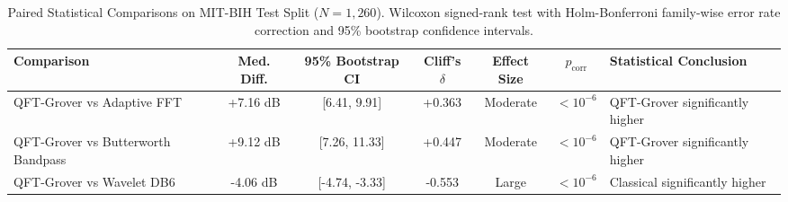 \begin{table}[t]
\centering
\caption{Paired Statistical Comparisons on MIT-BIH Test Split ($N=1,260$). Wilcoxon signed-rank test with Holm-Bonferroni family-wise error rate correction and 95\% bootstrap confidence intervals.}
\label{tab:statistics}
\begin{tabular}{lcccccl}
\hline
\textbf{Comparison} & \textbf{Med. Diff.} & \textbf{95\% Bootstrap CI} & \textbf{Cliff's $\delta$} & \textbf{Effect Size} & \textbf{$p_{\text{corr}}$} & \textbf{Statistical Conclusion} \\
\hline
QFT-Grover vs Adaptive FFT & +7.16 dB & [6.41, 9.91] & +0.363 & Moderate & $< 10^{-6}$ & QFT-Grover significantly higher \\
QFT-Grover vs Butterworth Bandpass & +9.12 dB & [7.26, 11.33] & +0.447 & Moderate & $< 10^{-6}$ & QFT-Grover significantly higher \\
QFT-Grover vs Wavelet DB6 & -4.06 dB & [-4.74, -3.33] & -0.553 & Large & $< 10^{-6}$ & Classical significantly higher \\
\hline
\end{tabular}
\end{table}

